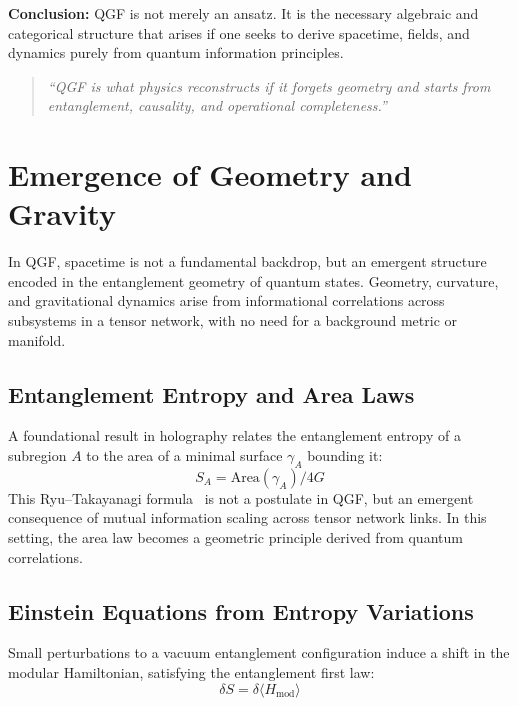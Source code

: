 \documentclass[11pt]{article}
\def\frac#1#2{#1/#2}
\begin{document}
\textbf{Conclusion:}  
QGF is not merely an ansatz. It is the necessary algebraic and categorical structure that arises if one seeks to derive spacetime, fields, and dynamics purely from quantum information principles.

\begin{quote}
\textit{“QGF is what physics reconstructs if it forgets geometry and starts from entanglement, causality, and operational completeness.”}
\end{quote}


\section{Emergence of Geometry and Gravity} \label{sec:emergence}

In QGF, spacetime is not a fundamental backdrop, but an emergent structure encoded in the entanglement geometry of quantum states. Geometry, curvature, and gravitational dynamics arise from informational correlations across subsystems in a tensor network, with no need for a background metric or manifold.

\subsection{Entanglement Entropy and Area Laws}

A foundational result in holography relates the entanglement entropy of a subregion \( A \) to the area of a minimal surface \( \gamma_A \) bounding it:
\begin{equation}
S_A = \frac{\text{Area}(\gamma_A)}{4G}
\end{equation}
This Ryu--Takayanagi formula~\cite{ryu2006holographic} is not a postulate in QGF, but an emergent consequence of mutual information scaling across tensor network links. In this setting, the area law becomes a geometric principle derived from quantum correlations.

\subsection{Einstein Equations from Entropy Variations}

Small perturbations to a vacuum entanglement configuration induce a shift in the modular Hamiltonian, satisfying the entanglement first law:
\begin{equation}
\delta S = \delta \langle H_{\text{mod}} \rangle
\end{equation}
\end{document}
